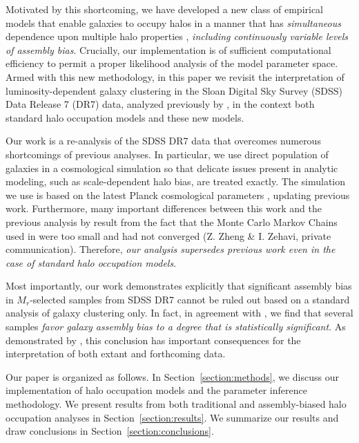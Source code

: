 \documentclass[usenatbib,usegraphicx,letterpaper]{mn2e}
\newcommand{\magr}{M_r}
\begin{document}
Motivated by this shortcoming, we have developed a new class of 
empirical models that enable galaxies to occupy halos in a manner
that has {\em simultaneous} dependence 
upon multiple halo properties \citep{hearin_etal16}, 
{\em including continuously variable levels of assembly bias}.
Crucially, our implementation is of sufficient computational efficiency 
to permit a proper likelihood analysis of the model parameter space. 
Armed with this new methodology, in this paper 
we revisit the interpretation of luminosity-dependent
galaxy clustering in the Sloan Digital Sky Survey (SDSS) Data Release
7 (DR7) data, analyzed previously by \citet{zehavi_etal11}, in the
context both standard halo occupation models and these new models.

Our work is a re-analysis of the SDSS DR7 data that 
overcomes numerous shortcomings of previous
analyses. In particular, we use direct population of galaxies in a
cosmological simulation so that delicate issues present in analytic
modeling, such as scale-dependent halo bias, are treated exactly.  The
simulation we use is based on the latest Planck cosmological
parameters \citep{planck13}, updating previous work. 
Furthermore, many important
differences between this work and the previous analysis by
\citet{zehavi_etal11} result from the fact that the Monte Carlo Markov
Chains used in \citet{zehavi_etal11} were too small and had not
converged (Z. Zheng \& I. Zehavi, private communication).  Therefore,
{\em our analysis supersedes previous work even in the case of
standard halo occupation models}.

Most importantly, our work demonstrates explicitly that significant
assembly bias in $\magr$-selected samples from SDSS DR7 cannot be ruled
out based on a standard analysis of galaxy clustering only. In fact,
in agreement with \citet{lehmann_etal15}, we find that several samples
{\em favor galaxy assembly bias to a degree that is statistically
  significant}. As demonstrated by \citet{zentner_etal14}, this
conclusion has important consequences for the interpretation of
both extant and forthcoming data. 

Our paper is organized as follows. In Section~\ref{section:methods},
we discuss our implementation of halo occupation models and the
parameter inference methodology. We present results
from both traditional and assembly-biased halo occupation analyses 
in Section~\ref{section:results}. We summarize our results and draw
conclusions in Section~\ref{section:conclusions}.

\end{document}
